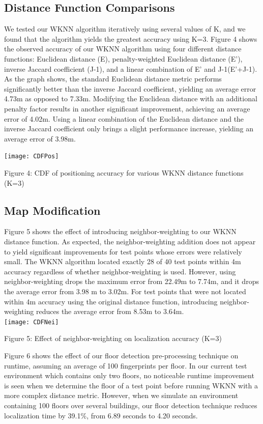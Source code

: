 \documentclass[twoside]{article}
\begin{document}
\begin{multicols}{2}
\subsection{Distance Function Comparisons}
\indent We tested our WKNN algorithm iteratively using several values of K, and we found that the algorithm yields the greatest accuracy using K=3. Figure 4 shows the observed accuracy of our WKNN algorithm using four different distance functions: Euclidean distance (E), penalty-weighted Euclidean distance (E'), inverse Jaccard coefficient (J-1), and a linear combination of E' and J-1(E'+J-1). As the graph shows, the standard Euclidean distance metric performs significantly better than the inverse Jaccard coefficient, yielding an average error 4.73m as opposed to 7.33m. Modifying the Euclidean distance with an additional penalty factor results in another significant improvement, achieving an average error of 4.02m. Using a linear combination of the Euclidean distance and the inverse Jaccard coefficient only brings a slight performance increase, yielding an average error of 3.98m. 

\texttt{[image: CDFPos]}
\begin{center}
Figure 4: CDF of positioning accuracy for various WKNN distance functions (K=3)
\end{center}

\subsection{Map Modification}
\indent Figure 5 shows the effect of introducing neighbor-weighting to our WKNN distance function. As expected, the neighbor-weighting addition does not appear to yield significant improvements for test points whose errors were relatively small. The WKNN algorithm located exactly 28 of 40 test points within 4m accuracy regardless of whether neighbor-weighting is used. However, using neighbor-weighting drops the maximum error from 22.49m to 7.74m, and it drops the average error from 3.98 m to 3.02m. For test points that were not located within 4m accuracy using the original distance function, introducing neighbor-weighting reduces the average error from 8.53m to 3.64m. \\

\texttt{[image: CDFNei]}
\begin{center}
Figure 5: Effect of neighbor-weighting on localization accuracy (K=3)
\end{center}

\indent Figure 6 shows the effect of our floor detection pre-processing technique on runtime, assuming an average of 100 fingerprints per floor. In our current test environment which contains only two floors, no noticeable runtime improvement is seen when we determine the floor of a test point before running WKNN with a more complex distance metric. However, when we simulate an environment containing 100 floors over several buildings, our floor detection technique reduces localization time by 39.1$\%$, from 6.89 seconds to 4.20 seconds.


\end{multicols}
\end{document}
